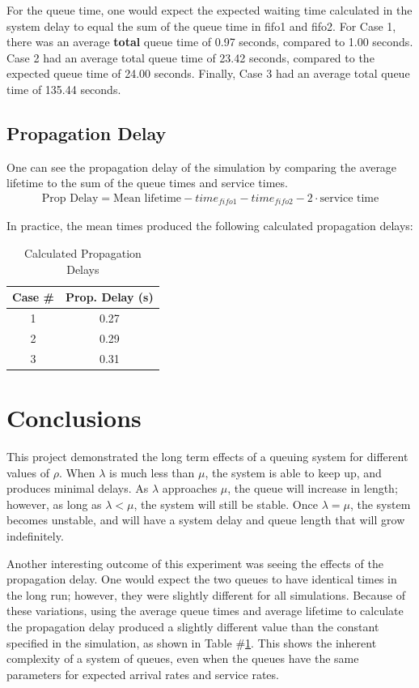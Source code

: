 \documentclass{article}
\begin{document}
For the queue time, one would expect the expected waiting time calculated in the system delay to equal the sum of the queue time in fifo1 and fifo2.
For Case 1, there was an average \textbf{total} queue time of 0.97 seconds, compared to 1.00 seconds.
Case 2 had an average total queue time of 23.42 seconds, compared to the expected queue time of 24.00 seconds.
Finally, Case 3 had an average total queue time of 135.44 seconds.

\subsection*{Propagation Delay}
One can see the propagation delay of the simulation by comparing the average lifetime to the sum of the queue times and service times.
\begin{align*}
\text{Prop Delay} = \text{Mean lifetime} - time_{fifo1} - time_{fifo2} - 2 \cdot \text{service time}
\end{align*}

In practice, the mean times produced the following calculated propagation delays:

\begin{table}[h!]
\centering
\begin{tabular}{|c|c|} \hline
\textbf{Case \#} & \textbf{Prop. Delay (s)} \\ \hline
1 & 0.27 \\ \hline
2 & 0.29 \\ \hline
3 & 0.31 \\ \hline
\end{tabular}
\caption{Calculated Propagation Delays}
\label{tab:calcPropDelay}
\end{table}


\section*{Conclusions}
This project demonstrated the long term effects of a queuing system for different values of $\rho$.  
When $\lambda$ is much less than $\mu$, the system is able to keep up, and produces minimal delays.  
As $\lambda$ approaches $\mu$, the queue will increase in length; however, as long as $\lambda < \mu$, the system will still be stable.
Once $\lambda = \mu$, the system becomes unstable, and will have a system delay and queue length that will grow indefinitely.

Another interesting outcome of this experiment was seeing the effects of the propagation delay.  
One would expect the two queues to have identical times in the long run; however, they were slightly different for all simulations.
Because of these variations, using the average queue times and average lifetime to calculate the propagation delay produced a slightly different value than the constant specified in the simulation, as shown in Table \#\ref{tab:calcPropDelay}.
This shows the inherent complexity of a system of queues, even when the queues have the same parameters for expected arrival rates and service rates.
\end{document}
